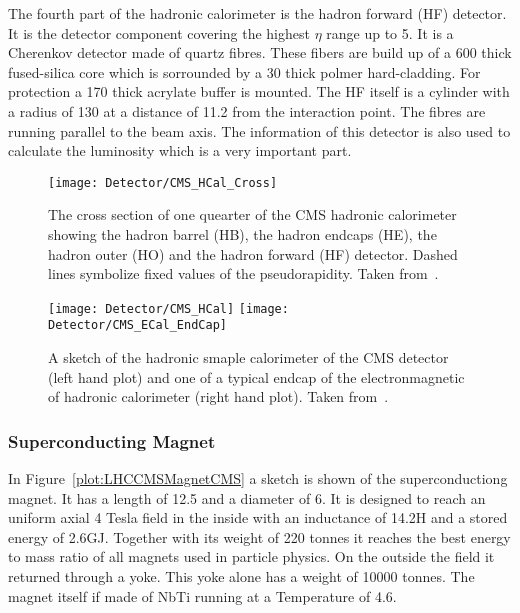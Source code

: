 The fourth part of the hadronic calorimeter is the hadron forward (HF) detector. It is the detector component  covering the  highest $\eta{}$ range up to 5. It is a Cherenkov detector made of quartz fibres. These fibers are build up of a 600\mum{} thick fused-silica core which is sorrounded by a 30\mum{} thick polmer hard-cladding. For protection a 170\mum{} thick acrylate buffer is mounted. The HF itself is a cylinder with a radius of 130\cm{} at a distance of 11.2\m{} from the interaction point. The fibres are running parallel to the beam axis. The information of this detector is also used to calculate the luminosity which is a very important part.

\begin{figure}[!Hhtb]
    \centering
    \texttt{[image: Detector/CMS\_HCal\_Cross]}
    \caption[Cross section of the CMS hadronic calorimeter]{The cross section of one quearter of the CMS hadronic calorimeter showing the hadron barrel (HB), the hadron endcaps (HE), the hadron outer (HO) and the hadron forward (HF) detector. Dashed lines symbolize fixed values of the pseudorapidity. Taken from~. \label{plot:LHCCMSHCalCross}}
\end{figure}

\begin{figure}[!Hhtb]
  \centering
  \texttt{[image: Detector/CMS\_HCal]}
  \texttt{[image: Detector/CMS\_ECal\_EndCap]}
  \caption[Sketches of the hadronic calorimeter of CMS]{A sketch of the hadronic smaple calorimeter of the CMS detector (left hand plot) and one of a typical endcap of the electronmagnetic of hadronic calorimeter (right hand plot). Taken from~. \label{plot:LHCCMSHCalCMS}}
\end{figure}

\subsubsection{Superconducting Magnet}

In Figure~\ref{plot:LHCCMSMagnetCMS} a sketch is shown of the superconductiong magnet. It has a length of 12.5\m{} and a diameter of 6\m{}. It is designed to reach an uniform axial 4 Tesla field in the inside with an inductance of 14.2\unit{H} and a stored energy of 2.6\unit{GJ}. Together with its weight of 220 tonnes it reaches the best energy to mass ratio of all magnets used in particle physics. On the outside the field it returned through a yoke. This yoke alone has a weight of 10000 tonnes. The magnet itself if made of NbTi running at a Temperature of 4.6\K{}.

